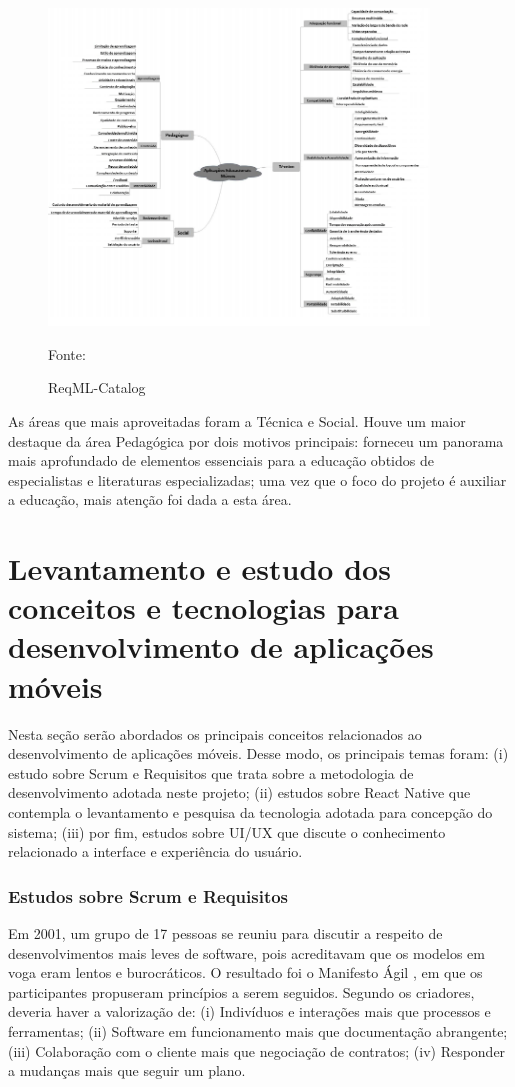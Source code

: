 \begin{figure}[H]
\centering
    \caption{ReqML-Catalog}
    \label{fig:reqML}
    \includegraphics[width=0.9\textwidth]{Figuras/reqML-catalog.png}
    
    Fonte: \cite{soad2017reqml}
\end{figure}

As áreas que mais aproveitadas foram a Técnica e Social. Houve um maior destaque da área Pedagógica por dois motivos principais: forneceu um panorama mais aprofundado de elementos essenciais para a educação obtidos de especialistas e literaturas especializadas; uma vez que o foco do projeto é auxiliar a educação, mais atenção foi dada a esta área.

\section{Levantamento e estudo dos conceitos e tecnologias para desenvolvimento de aplicações móveis}

Nesta seção serão abordados os principais conceitos relacionados ao desenvolvimento de aplicações móveis. Desse modo, os principais temas foram: (i) estudo sobre Scrum e Requisitos que trata sobre a metodologia de desenvolvimento adotada neste projeto; (ii) estudos sobre React Native que contempla o levantamento e pesquisa da tecnologia adotada para concepção do sistema; (iii) por fim, estudos sobre UI/UX que discute o conhecimento relacionado a interface e experiência do usuário.

\subsubsection{Estudos sobre Scrum e Requisitos} 
Em 2001, um grupo de 17 pessoas se reuniu para discutir a respeito de desenvolvimentos mais leves de software, pois acreditavam que os modelos em voga eram lentos e burocráticos. O resultado foi o Manifesto Ágil \citep{agileManifesto}, em que os participantes propuseram princípios a serem seguidos. Segundo os criadores, deveria haver a valorização de: (i) Indivíduos e interações mais que processos e ferramentas; (ii) Software em funcionamento mais que documentação abrangente; (iii) Colaboração com o cliente mais que negociação de contratos; (iv) Responder a mudanças mais que seguir um plano.

